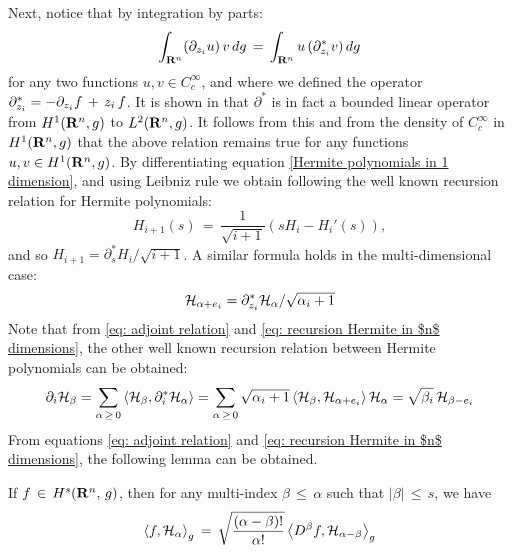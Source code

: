 Next, notice that by integration by parts:
\begin{equation}
    \int_{\real^n}(\pard{u}{z_i})\, v\,d\stdgaussian \,=\,\int_{\real^n}u \, (\partial^*_{z_i} v)\,d\stdgaussian  
    \label{eq: adjoint relation}
\end{equation}
for any two functions $u,v \in C^{\infty}_c$, and where we defined the operator
$\partial^*_{z_i} = -\pard{f}{z_i} \,+\,z_i \,f $. It is shown in
\cite{lorenzi2006analytical} that $\partial^*$ is in fact a bounded linear
operator from $H^1(\real^n, g)$ to $L^2(\real^n, g)$. It follows from this and
from the density of $C^\infty_c$ in $H^1(\real^n,g)$ that the above
relation remains true for any functions $u,v \in H^1(\real^n, g)$.  
By differentiating equation \eqref{Hermite polynomials in 1 dimension}, and
using Leibniz rule we obtain following the well known recursion relation for
Hermite polynomials: 
$$ H_{i+1}(s) \,=\, \frac{1}{\sqrt{i+1}}(s H_i - H_i'(s)),$$
and so $H_{i+1} =  \partial^*_s H_i/\sqrt{i+1}$. A similar formula holds in the
multi-dimensional case: 
\begin{equation}
\hermite H_{\alpha + e_i} =  \partial^*_{z_i} \hermite H_\alpha/\sqrt{\alpha_i+1}
\label{eq: recursion Hermite in $n$ dimensions}
\end{equation}
Note that from \cref{eq: adjoint relation} and \cref{eq: recursion Hermite in
    $n$ dimensions}, the other well known recursion relation between Hermite
polynomials can be obtained:
\begin{equation}
    \partial_i \hermite H_{\beta} = \sum_{\alpha \,\geq\, 0} \ip{\hermite H_\beta}{\partial_i^* \hermite H_\alpha} = \sum_{\alpha \,\geq\, 0} \sqrt{\alpha_i+1}\ip{\hermite H_\beta}{\hermite H_{\alpha+e_i}} \hermite H_\alpha = \sqrt{\beta_i} \, \hermite H_{\beta-e_i}
\label{eq: recursion Hermite derivative}
\end{equation}
From equations \eqref{eq: adjoint relation} and \eqref{eq: recursion Hermite in
$n$ dimensions}, the following lemma can be obtained. 
\begin{lemma}
    If $f\,\in\, H^s(\real^n, \, g)$, then for any multi-index $\beta\,
    \leq \,\alpha$ such that $|\beta|\, \leq \,s$, we have
    $$
        \left \langle f, \hermite H_\alpha \right \rangle_g \,=\,\sqrt{\frac
                {(\alpha-\beta)!}{\alpha!}} \left \langle D^\beta f, \hermite H_{\alpha-\beta} \right \rangle_g 
    $$ 
    \label{proposition: coeff Hermite multidimensional}
\end{lemma}
